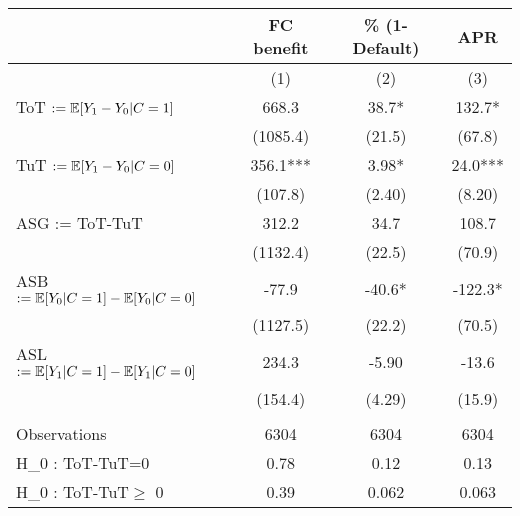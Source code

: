 \begin{tabular}{lccc}
\toprule
      & FC benefit & \% (1-Default) & APR \\
\midrule
      & (1)   & (2)   & (3) \\
\midrule
\midrule
ToT $:= \mathbb{E}[Y_1 - Y_0 | C=1]$ & 668.3 & 38.7* & 132.7* \\
      & (1085.4) & (21.5) & (67.8) \\
TuT $:= \mathbb{E}[Y_1 - Y_0 | C=0]$ & 356.1*** & 3.98* & 24.0*** \\
      & (107.8) & (2.40) & (8.20) \\
\midrule
ASG := ToT-TuT & 312.2 & 34.7  & 108.7 \\
      & (1132.4) & (22.5) & (70.9) \\
ASB $:= \mathbb{E}[Y_0 | C=1]-\mathbb{E}[Y_0 | C=0]$ & -77.9 & -40.6* & -122.3* \\
      & (1127.5) & (22.2) & (70.5) \\
ASL $:= \mathbb{E}[Y_1 | C=1]-\mathbb{E}[Y_1 | C=0]$ & 234.3 & -5.90 & -13.6 \\
      & (154.4) & (4.29) & (15.9) \\
      &       &       &  \\
\midrule
Observations & 6304  & 6304  & 6304 \\
H_0 : ToT-TuT=0 & 0.78  & 0.12  & 0.13 \\
H_0 : ToT-TuT$\geq$ 0 & 0.39  & 0.062 & 0.063 \\
\bottomrule
\bottomrule
\end{tabular}%

